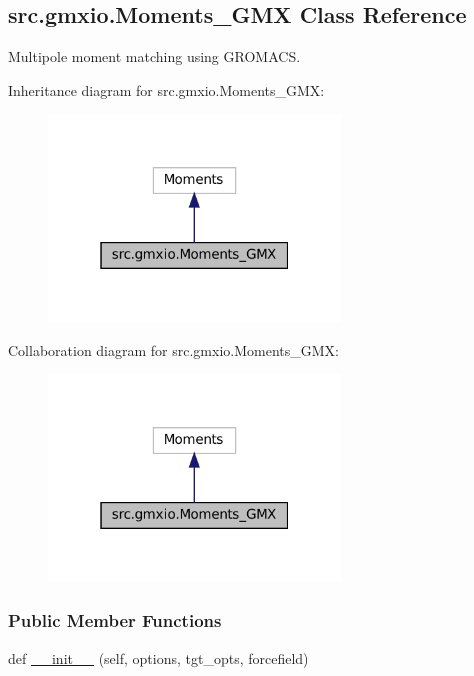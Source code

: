 \hypertarget{classsrc_1_1gmxio_1_1Moments__GMX}{}\subsection{src.\+gmxio.\+Moments\+\_\+\+G\+MX Class Reference}
\label{classsrc_1_1gmxio_1_1Moments__GMX}


Multipole moment matching using G\+R\+O\+M\+A\+CS.  




Inheritance diagram for src.\+gmxio.\+Moments\+\_\+\+G\+MX\+:
\nopagebreak
\begin{figure}[H]
\begin{center}
\leavevmode
\includegraphics[width=220pt]{classsrc_1_1gmxio_1_1Moments__GMX__inherit__graph}
\end{center}
\end{figure}


Collaboration diagram for src.\+gmxio.\+Moments\+\_\+\+G\+MX\+:
\nopagebreak
\begin{figure}[H]
\begin{center}
\leavevmode
\includegraphics[width=220pt]{classsrc_1_1gmxio_1_1Moments__GMX__coll__graph}
\end{center}
\end{figure}
\subsubsection*{Public Member Functions}
\begin{DoxyCompactItemize}
\item 
def \hyperlink{classsrc_1_1gmxio_1_1Moments__GMX_aa9e32792e45e50f3f860ce98b08f98b8}{\+\_\+\+\_\+init\+\_\+\+\_\+} (self, options, tgt\+\_\+opts, forcefield)
\end{DoxyCompactItemize}
